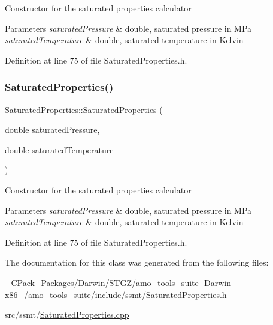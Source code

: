Constructor for the saturated properties calculator 
\begin{DoxyParams}{Parameters}
{\em saturated\+Pressure} & double, saturated pressure in M\+Pa \\
\hline
{\em saturated\+Temperature} & double, saturated temperature in Kelvin \\
\hline
\end{DoxyParams}


Definition at line 75 of file Saturated\+Properties.\+h.

\mbox{\label{class_saturated_properties_a83cc16d024ff9bd7ac586df9e946a062}} 
\subsubsection{\texorpdfstring{Saturated\+Properties()}{SaturatedProperties()}\hspace{0.1cm}{\footnotesize\ttfamily [3/3]}}
{\footnotesize\ttfamily Saturated\+Properties\+::\+Saturated\+Properties (\begin{DoxyParamCaption}\item[{double}]{saturated\+Pressure,  }\item[{double}]{saturated\+Temperature }\end{DoxyParamCaption})\hspace{0.3cm}{\ttfamily [inline]}}

Constructor for the saturated properties calculator 
\begin{DoxyParams}{Parameters}
{\em saturated\+Pressure} & double, saturated pressure in M\+Pa \\
\hline
{\em saturated\+Temperature} & double, saturated temperature in Kelvin \\
\hline
\end{DoxyParams}


Definition at line 75 of file Saturated\+Properties.\+h.



The documentation for this class was generated from the following files\+:\begin{DoxyCompactItemize}
\item 
\+\_\+\+C\+Pack\+\_\+\+Packages/\+Darwin/\+S\+T\+G\+Z/amo\+\_\+tools\+\_\+suite-\/-\/\+Darwin-\/x86\+\_/amo\+\_\+tools\+\_\+suite/include/ssmt/\hyperlink{___c_pack___packages_2_darwin_2_s_t_g_z_2amo__tools__suite--_darwin-x86__64_2amo__tools__suite_2b97ccf799ea6561aa4d6a618c8073459}{Saturated\+Properties.\+h}\item 
src/ssmt/\hyperlink{_saturated_properties_8cpp}{Saturated\+Properties.\+cpp}\end{DoxyCompactItemize}
